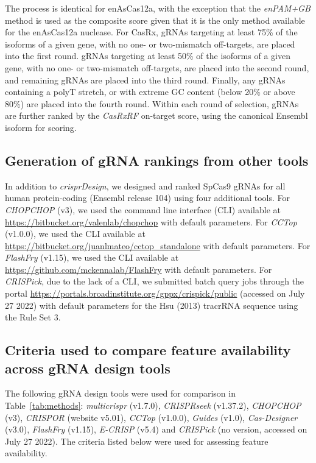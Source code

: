 \documentclass[pdftex,english,10pt]{article}
\begin{document}
{The process is identical for enAsCas12a, with the exception that the \textit{enPAM+GB} method is used as the composite score given that it is the only method available for the enAsCas12a nuclease. For CasRx, gRNAs targeting at least 75\% of the isoforms of a given gene, with no one- or two-mismatch off-targets, are placed into the first round. gRNAs targeting at least 50\% of the isoforms of a given gene, with no one- or two-mismatch off-targets, are placed into the second round, and remaining gRNAs are placed into the third round. Finally, any gRNAs containing a polyT stretch, or with extreme GC content (below 20\% or above 80\%) are placed into the fourth round. Within each round of selection, gRNAs are further ranked by the \textit{CasRxRF} on-target score, using the canonical Ensembl isoform for scoring.





\subsection*{Generation of gRNA rankings from other tools}

In addition to \textit{crisprDesign}, we designed and ranked SpCas9 gRNAs for all human protein-coding (Ensembl release 104) using four additional tools. 
For \textit{CHOPCHOP} (v3), we used the command line interface (CLI) available at \url{https://bitbucket.org/valenlab/chopchop} with default parameters.
For \textit{CCTop} (v1.0.0), we used the CLI available at \url{https://bitbucket.org/juanlmateo/cctop_standalone} with default parameters. 
For \textit{FlashFry} (v1.15), we used the CLI available at \url{https://github.com/mckennalab/FlashFry} with default parameters. 
For \textit{CRISPick}, due to the lack of a CLI, we submitted batch query jobs through the portal \url{https://portals.broadinstitute.org/gppx/crispick/public} (accessed on July 27 2022) with default parameters for the Hsu (2013) tracrRNA sequence using the Rule Set 3. 



\subsection*{Criteria used to compare feature availability across gRNA design tools}

The following gRNA design tools were used for comparison in Table~\ref{tab:methods}: \textit{multicrispr} (v1.7.0), \textit{CRISPRseek} (v1.37.2), \textit{CHOPCHOP} (v3), \textit{CRISPOR} (website v5.01), \textit{CCTop} (v1.0.0), \textit{Guides} (v1.0), \textit{Cas-Designer} (v3.0), \textit{FlashFry} (v1.15), \textit{E-CRISP} (v5.4) and  \textit{CRISPick} (no version, accessed on July 27 2022). 
The criteria listed below were used for assessing feature availability.

}
\end{document}
